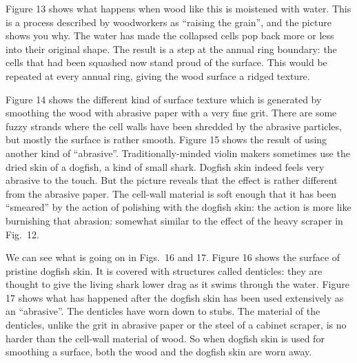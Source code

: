   Figure 13 shows what happens when wood like this is moistened with water. 
  This is a process described by woodworkers as “raising the grain”, and the 
  picture shows you why. The water has made the collapsed cells pop back more 
  or less into their original shape. The result is a step at the annual ring 
  boundary: the cells that had been squashed now stand proud of the surface. 
  This would be repeated at every annual ring, giving the wood surface a ridged 
  texture. 

  Figure 14 shows the different kind of surface texture which is generated by 
  smoothing the wood with abrasive paper with a very fine grit. There are some 
  fuzzy strands where the cell walls have been shredded by the abrasive 
  particles, but mostly the surface is rather smooth. Figure 15 shows the 
  result of using another kind of “abrasive”. Traditionally-minded violin 
  makers sometimes use the dried skin of a dogfish, a kind of small shark. 
  Dogfish skin indeed feels very abrasive to the touch. But the picture reveals 
  that the effect is rather different from the abrasive paper. The cell-wall 
  material is soft enough that it has been “smeared” by the action of polishing 
  with the dogfish skin: the action is more like burnishing that abrasion: 
  somewhat similar to the effect of the heavy scraper in Fig.\ 12. 

  We can see what is going on in Figs.\ 16 and 17. Figure 16 shows the surface 
  of pristine dogfish skin. It is covered with structures called denticles: 
  they are thought to give the living shark lower drag as it swims through the 
  water. Figure 17 shows what has happened after the dogfish skin has been used 
  extensively as an “abrasive”. The denticles have worn down to stubs. The 
  material of the denticles, unlike the grit in abrasive paper or the steel of 
  a cabinet scraper, is no harder than the cell-wall material of wood. So when 
  dogfish skin is used for smoothing a surface, both the wood and the dogfish 
  skin are worn away. 